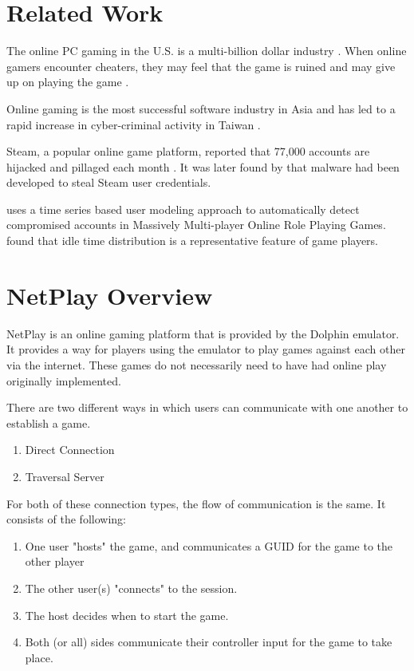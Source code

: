 \documentclass[conference]{IEEEtran}
\begin{document}
\section{Related Work}
The online PC gaming in the U.S. is a multi-billion dollar industry \cite{takahashi15}. When online gamers encounter cheaters, they may feel that the game is ruined and may give up on playing the game \cite{yan02}.

Online gaming is the most successful software industry in Asia and has led to a rapid increase in cyber-criminal activity in Taiwan \cite{chen04}. 

Steam, a popular online game platform, reported that 77,000 accounts are hijacked and pillaged each month \cite{steam15}. It was later found by \cite{pontiroli16} that malware had been developed to steal Steam user credentials.

\cite{oh12} uses a time series based user modeling approach to automatically detect compromised accounts in Massively Multi-player Online Role Playing Games. \cite{chen07} found that idle time distribution is a representative feature of game players.

\section{NetPlay Overview}
NetPlay is an online gaming platform that is provided by the Dolphin emulator. It provides a way for players using the emulator to play games against each other via the internet. These games do not necessarily need to have had online play originally implemented. 


There are two different ways in which users can communicate with one another to establish a game.
\vspace{0.5cm}
\begin{enumerate}  
\item Direct Connection
\item Traversal Server
\end{enumerate}
\vspace{0.5cm}
For both of these connection types, the flow of communication is the same. It consists of the following:

\begin{enumerate}  
\item One user "hosts" the game, and communicates a GUID for the game to the other player
\item The other user(s) "connects" to the session.
\item The host decides when to start the game.
\item Both (or all) sides communicate their controller input for the game to take place.
\end{enumerate}
\vspace{0.cm}
\end{document}
